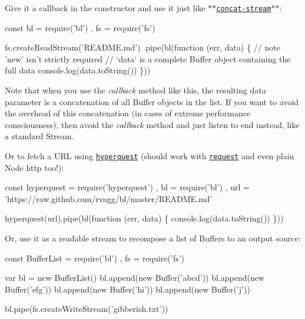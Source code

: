 Give it a callback in the constructor and use it just like $\ast$$\ast$\href{https://github.com/maxogden/node-concat-stream}{\tt concat-\/stream}$\ast$$\ast$\+:


\begin{DoxyCode}
\textcolor{keyword}{const} bl = require(\textcolor{stringliteral}{'bl'})
    , fs = require(\textcolor{stringliteral}{'fs'})

fs.createReadStream('README.md')
  .pipe(bl(function (err, data) \{ \textcolor{comment}{// note 'new' isn't strictly required}
    \textcolor{comment}{// `data` is a complete Buffer object containing the full data}
    console.log(data.toString())
  \}))
\end{DoxyCode}


Note that when you use the {\itshape callback} method like this, the resulting {\ttfamily data} parameter is a concatenation of all {\ttfamily Buffer} objects in the list. If you want to avoid the overhead of this concatenation (in cases of extreme performance consciousness), then avoid the {\itshape callback} method and just listen to {\ttfamily \textquotesingle{}end\textquotesingle{}} instead, like a standard Stream.

Or to fetch a U\+R\+L using \href{https://github.com/substack/hyperquest}{\tt hyperquest} (should work with \href{http://github.com/mikeal/request}{\tt request} and even plain Node http too!)\+: 
\begin{DoxyCode}
\textcolor{keyword}{const} hyperquest = require(\textcolor{stringliteral}{'hyperquest'})
    , bl         = require(\textcolor{stringliteral}{'bl'})
    , url        = \textcolor{stringliteral}{'https://raw.github.com/rvagg/bl/master/README.md'}

hyperquest(url).pipe(bl(\textcolor{keyword}{function} (err, data) \{
  console.log(data.toString())
\}))
\end{DoxyCode}


Or, use it as a readable stream to recompose a list of Buffers to an output source\+:


\begin{DoxyCode}
\textcolor{keyword}{const} BufferList = require(\textcolor{stringliteral}{'bl'})
    , fs         = require(\textcolor{stringliteral}{'fs'})

var bl = new BufferList()
bl.append(new Buffer('abcd'))
bl.append(new Buffer('efg'))
bl.append(new Buffer('hi'))
bl.append(new Buffer('j'))

bl.pipe(fs.createWriteStream('gibberish.txt'))
\end{DoxyCode}


